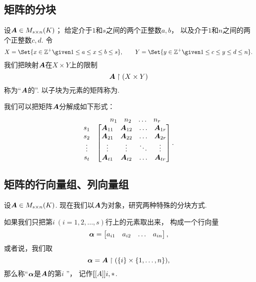 \subsection{矩阵的分块}
\begin{definition}
设\(\boldsymbol{A}\in M_{s \times n}(K)\)；
给定介于\(1\)和\(s\)之间的两个正整数\(a,b\)，
以及介于\(1\)和\(n\)之间的两个正整数\(c,d\).
令\[
	X=\Set{ x\in\mathbb{Z}^+ \given 1 \leq a \leq x \leq b \leq s },
	\qquad
	Y=\Set{ y\in\mathbb{Z}^+ \given 1 \leq c \leq y \leq d \leq n }.
\]
我们把映射\(\boldsymbol{A}\)在\(X \times Y\)上的限制\[
	\boldsymbol{A}\upharpoonright(X \times Y)
\]称为“\(\boldsymbol{A}\)的”.
以子块为元素的矩阵称为.
\end{definition}

我们可以把矩阵\(\boldsymbol{A}\)分解成如下形式：
\[
	\begin{matrix}
		& \begin{matrix} n_1 & n_2 & \dots & n_r \end{matrix} \\
			\begin{matrix} s_1 \\ s_2 \\ \vdots \\ s_t \end{matrix} & \begin{bmatrix}
			\boldsymbol{A}_{11} & \boldsymbol{A}_{12} & \dots & \boldsymbol{A}_{1r} \\
			\boldsymbol{A}_{21} & \boldsymbol{A}_{22} & \dots & \boldsymbol{A}_{2r} \\
			\vdots & \vdots & \ddots & \vdots \\
			\boldsymbol{A}_{t1} & \boldsymbol{A}_{t2} & \dots & \boldsymbol{A}_{tr}
		\end{bmatrix}.
	\end{matrix}
\]

\subsection{矩阵的行向量组、列向量组}
设\(\boldsymbol{A}\in M_{s \times n}(K)\).
现在我们以\(\boldsymbol{A}\)为对象，研究两种特殊的分块方式.

如果我们只把第\(i\ (i=1,2,\dotsc,s)\)行上的元素取出来，
构成一个行向量\[
	\boldsymbol\alpha=\begin{bmatrix}
		a_{i1} & a_{i2} & \dots & a_{in}
	\end{bmatrix},
\]
或者说，我们取\[
	\boldsymbol\alpha=\boldsymbol{A}\upharpoonright(\{i\}\times\{1,\dotsc,n\}),
\]
那么称“\(\boldsymbol\alpha\)是\(\boldsymbol{A}\)的第\(i\) ”，
记作\(\boldsymbol[[A]]{i,*}\).

